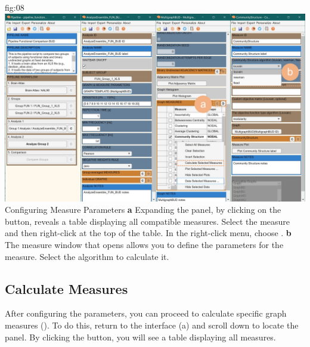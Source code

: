 \documentclass[justified]{tufte-handout}
\begin{document}
	{fig:08}
	{
	\includegraphics{fig08.jpg}
	}
	{Configuring Measure Parameters}
	{
	{\bf a} Expanding the  panel, by clicking on the  button, reveals a table displaying all compatible measures. 
	Select the  measure and then right-click at the top of the table. In the right-click menu, choose .
	{\bf b} The measure window that opens allows you to define the parameters for the  measure. Select the  algorithm to calculate it.
	}


\clearpage
\subsection{Calculate Measures}
 
After configuring the parameters, you can proceed to calculate specific graph measures (). To do this, return to the  interface (a) and scroll down to locate the  panel. By clicking the  button, you will see a table displaying all measures.
\end{document}
